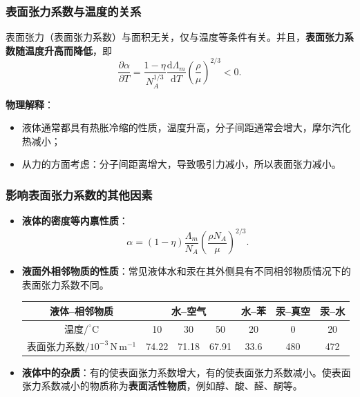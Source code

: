 \documentclass[UTF8]{ctexart}
\theoremstyle{definition}
\begin{document}
\subsubsection*{表面张力系数与温度的关系}

表面张力（表面张力系数）与面积无关，仅与温度等条件有关。并且，\textbf{表面张力系数随温度升高而降低}，即
\begin{equation}
\frac{\partial\alpha}{\partial T} = \frac{1-\eta}{N_A^{1/3}}\frac{\mathrm{d}\Lambda_m}{\mathrm{d}T}\left(\frac{\rho}{\mu}\right)^{2/3} < 0.
\end{equation}

\textbf{物理解释}：
\begin{itemize}
    \item 液体通常都具有热胀冷缩的性质，温度升高，分子间距通常会增大，摩尔汽化热减小；
    \item 从力的方面考虑：分子间距离增大，导致吸引力减小，所以表面张力减小。
\end{itemize}

\subsubsection*{影响表面张力系数的其他因素}

\begin{itemize}
    \item \textbf{液体的密度等内禀性质}：
    \begin{equation}
    \alpha = (1-\eta)\frac{\Lambda_m}{N_A}\left(\frac{\rho N_A}{\mu}\right)^{2/3}.
    \end{equation}
    
    \item \textbf{液面外相邻物质的性质}：常见液体水和汞在其外侧具有不同相邻物质情况下的表面张力系数不同。
    
    \begin{center}
    \begin{tabular}{c|ccc|c|c|c}
    \hline
    液体--相邻物质 & \multicolumn{3}{c|}{水--空气} & 水--苯 & 汞--真空 & 汞--水 \\
    \hline
    温度$/^\circ\mathrm{C}$ & 10 & 30 & 50 & 20 & 0 & 20 \\
    表面张力系数$/10^{-3}\,\mathrm{N\,m^{-1}}$ & 74.22 & 71.18 & 67.91 & 33.6 & 480 & 472 \\
    \hline
    \end{tabular}
    \end{center}
    
    \item \textbf{液体中的杂质}：有的使表面张力系数增大，有的使表面张力系数减小。使表面张力系数减小的物质称为\textbf{表面活性物质}，例如醇、酸、醛、酮等。
\end{itemize}
\end{document}
